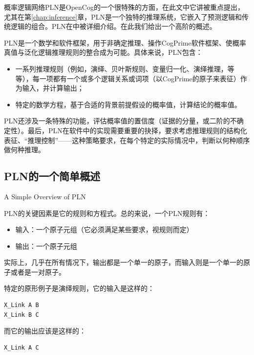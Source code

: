 概率逻辑网络PLN是OpenCog的一个很特殊的方面，在此文中它讲被重点提出，尤其在第\ref{chap:inference}章，PLN是一个独特的推理系统，它嵌入了预测逻辑和传统逻辑的组合。PLN在\cite{Goertzel2008, RWR}中被详细介绍。在此我们给出一个高阶的概述。

PLN是一个数学和软件框架，用于非确定推理、操作CogPrime软件框架、使概率真值与泛化逻辑推理规则的整合成为可能。具体来说，PLN包含：

\begin{itemize}
\item 一系列推理规则（例如，演绎、贝叶斯规则、变量归一化、演绎推理，等等），每一项都有一个或多个逻辑关系或词项（以CogPrime的原子来表征）作为输入，并计算输出；
\item 特定的数学方程，基于合适的背景前提假设的概率值，计算结论的概率值。
\end{itemize}
PLN还涉及一条特殊的功能，评估概率值的置信度（证据的分量，或二阶的不确定性）。最后，PLN在软件中的实现需要重要的抉择，要求考虑推理规则的结构化表征、“推理控制”——这种策略要求，在每个特定的实际情况中，判断以何种顺序做何种推理。

\subsection{PLN的一个简单概述}{A Simple Overview of PLN}

PLN的关键因素是它的规则和方程式。总的来说，一个PLN规则有：

\begin{itemize}
\item 输入：一个原子元组（它必须满足某些要求，视规则而定）
\item 输出：一个原子元组
\end{itemize}

实际上，几乎在所有情况下，输出都是一个单一的原子，而输入则是一个单一的原子或者是一对原子。

特定的原形例子是演绎规则，它的输入是这样的：

{\tt\begin{small}\begin{lstlisting}
X_Link A B
X_Link B C
\end{lstlisting}\end{small}}

而它的输出应该是这样的：

{\tt\begin{small}\begin{lstlisting}
X_Link A C
\end{lstlisting}\end{small}}

